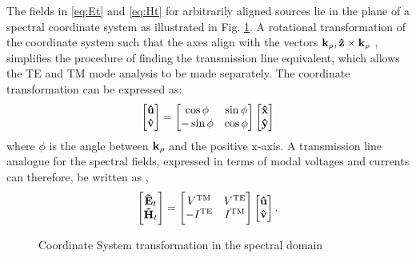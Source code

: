 \documentclass[12pt]{article}
\begin{document}
The fields in \eqref{eq:Et} and  \eqref{eq:Ht} for arbitrarily aligned sources lie in the plane of a spectral coordinate system as illustrated in Fig. \ref{fig:SpCS}. A rotational transformation of the coordinate system such that the axes align with the vectors $\mathbf{k}_{\rho}, \mathbf{\hat z} \times \mathbf{k}_{\rho}$ \cite{itoh1980}, simplifies the procedure of finding the transmission line equivalent, which allows the TE and TM mode analysis to be made separately. The coordinate transformation can be expressed as:
%
\begin{equation}
\begin{bmatrix}
\mathbf{\hat u} \\
\mathbf{\hat v}
\end{bmatrix}
=
\begin{bmatrix}
\cos \phi & \sin \phi \\
-\sin \phi & \cos \phi
\end{bmatrix}
\begin{bmatrix}
\mathbf{\hat x} \\
\mathbf{\hat y}
\end{bmatrix}
\label{eq:transformation}
\end{equation}
%
where $\phi$ is the angle between $\mathbf{k_{\rho}}$ and the positive x-axis. A transmission line analogue for the spectral fields, expressed in terms of modal voltages and currents can therefore, be written as \cite{kastner1988, michalski1997multilayered},
%
\begin{equation}
  \begin{bmatrix}
    \mathbf{\tilde{E}}_t \\
    \mathbf{\tilde{H}}_t
  \end{bmatrix}
  =
  \begin{bmatrix}
    V^{\mathrm{TM}} & V^{\mathrm{TE}} \\
    -I^{\mathrm{\mathrm{TE}}} & I^{\mathrm{TM}}
  \end{bmatrix}
  \begin{bmatrix}
    \mathbf{\hat u} \\
    \mathbf{\hat v}
  \end{bmatrix}
  \label{eq:EHVI}.
\end{equation}
%
\begin{figure}[t!]
  \centering
  \def\svgwidth{.75\linewidth}
  
  \caption{Coordinate System transformation in the spectral domain}
  \label{fig:SpCS}
\end{figure}
\end{document}
